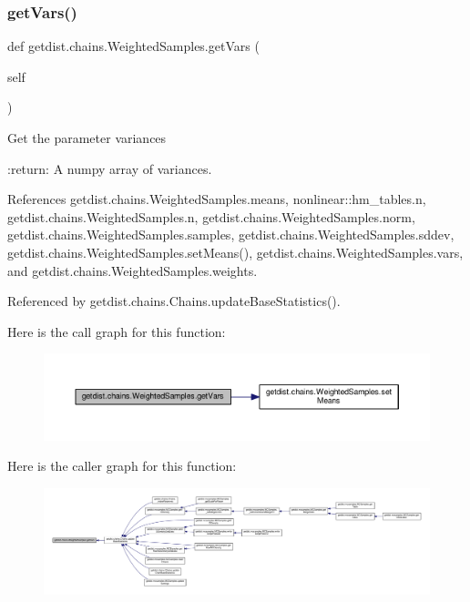 \subsubsection{\texorpdfstring{get\+Vars()}{getVars()}}
{\footnotesize\ttfamily def getdist.\+chains.\+Weighted\+Samples.\+get\+Vars (\begin{DoxyParamCaption}\item[{}]{self }\end{DoxyParamCaption})}

\begin{DoxyVerb}Get the parameter variances

:return: A numpy array of variances.
\end{DoxyVerb}
 

References getdist.\+chains.\+Weighted\+Samples.\+means, nonlinear\+::hm\+\_\+tables.\+n, getdist.\+chains.\+Weighted\+Samples.\+n, getdist.\+chains.\+Weighted\+Samples.\+norm, getdist.\+chains.\+Weighted\+Samples.\+samples, getdist.\+chains.\+Weighted\+Samples.\+sddev, getdist.\+chains.\+Weighted\+Samples.\+set\+Means(), getdist.\+chains.\+Weighted\+Samples.\+vars, and getdist.\+chains.\+Weighted\+Samples.\+weights.



Referenced by getdist.\+chains.\+Chains.\+update\+Base\+Statistics().

Here is the call graph for this function\+:
\nopagebreak
\begin{figure}[H]
\begin{center}
\leavevmode
\includegraphics[width=350pt]{classgetdist_1_1chains_1_1WeightedSamples_ad18581999b99b52a6e0e7a5b587e0208_cgraph}
\end{center}
\end{figure}
Here is the caller graph for this function\+:
\nopagebreak
\begin{figure}[H]
\begin{center}
\leavevmode
\includegraphics[width=350pt]{classgetdist_1_1chains_1_1WeightedSamples_ad18581999b99b52a6e0e7a5b587e0208_icgraph}
\end{center}
\end{figure}
\mbox{\label{classgetdist_1_1chains_1_1WeightedSamples_af09edaafcc644533d7c24107f2daec81}} 

